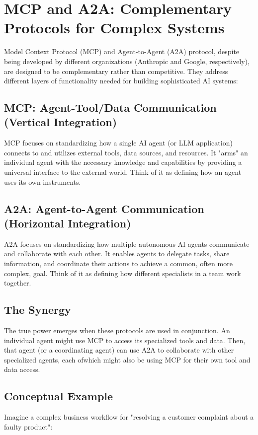 \section{MCP and A2A: Complementary Protocols for Complex Systems}

Model Context Protocol (MCP) and Agent-to-Agent (A2A) protocol, despite being developed by different organizations (Anthropic and Google, respectively), 
are designed to be complementary rather than competitive. They address different layers of functionality needed for building sophisticated AI systems:

\subsection*{MCP: Agent-Tool/Data Communication (Vertical Integration)}
MCP focuses on standardizing how a single AI agent (or LLM application) connects to and utilizes external tools, data sources, and resources. 
It "arms" an individual agent with the necessary knowledge and capabilities by providing a universal interface to the external world. 
Think of it as defining how an agent uses its own instruments.

\subsection*{A2A: Agent-to-Agent Communication (Horizontal Integration)}
A2A focuses on standardizing how multiple autonomous AI agents communicate and collaborate with each other. It enables agents to 
delegate tasks, share information, and coordinate their actions to achieve a common, often more complex, goal. 
Think of it as defining how different specialists in a team work together.

\subsection*{The Synergy}
The true power emerges when these protocols are used in conjunction. An individual agent might use MCP to access its specialized tools and data. 
Then, that agent (or a coordinating agent) can use A2A to collaborate with other specialized agents, each ofwhich might also be
 using MCP for their own tool and data access.

\subsection*{Conceptual Example}
Imagine a complex business workflow for "resolving a customer complaint about a faulty product":

